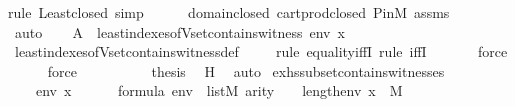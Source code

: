\begin{isabellebody}
{\isacharparenleft}{\kern0pt}rule\ Least{\isacharunderscore}{\kern0pt}closed{\isacharcomma}{\kern0pt}\ simp{\isacharparenright}{\kern0pt}\isanewline
\ \ \ \ \isamarkupfalse%
\ domain{\isacharunderscore}{\kern0pt}closed\ cartprod{\isacharunderscore}{\kern0pt}closed\ P{\isacharunderscore}{\kern0pt}in{\isacharunderscore}{\kern0pt}M\ assms\isanewline
\ \ \ \ \isamarkupfalse%
\ auto\isanewline
\isanewline
\ \ \isamarkupfalse%
\ {\isachardoublequoteopen}{\isacharquery}{\kern0pt}A\ {\isacharequal}{\kern0pt}\ least{\isacharunderscore}{\kern0pt}indexes{\isacharunderscore}{\kern0pt}of{\isacharunderscore}{\kern0pt}Vset{\isacharunderscore}{\kern0pt}contains{\isacharunderscore}{\kern0pt}witness{\isacharparenleft}{\kern0pt}{\isasymphi}{\isacharcomma}{\kern0pt}\ env{\isacharcomma}{\kern0pt}\ x{\isacharparenright}{\kern0pt}{\isachardoublequoteclose}\ \isanewline
\ \ \ \ \isamarkupfalse%
\ least{\isacharunderscore}{\kern0pt}indexes{\isacharunderscore}{\kern0pt}of{\isacharunderscore}{\kern0pt}Vset{\isacharunderscore}{\kern0pt}contains{\isacharunderscore}{\kern0pt}witness{\isacharunderscore}{\kern0pt}def\isanewline
\ \ \ \ \isamarkupfalse%
{\isacharparenleft}{\kern0pt}rule\ equality{\isacharunderscore}{\kern0pt}iffI{\isacharcomma}{\kern0pt}\ rule\ iffI{\isacharparenright}{\kern0pt}\isanewline
\ \ \ \ \ \isamarkupfalse%
\ force\isanewline
\ \ \ \ \isamarkupfalse%
\ force\isanewline
\ \ \ \ \isamarkupfalse%
\isanewline
\isanewline
\ \ \isamarkupfalse%
\ \isamarkupfalse%
\ {\isacharquery}{\kern0pt}thesis\ \isamarkupfalse%
\ H\ \isamarkupfalse%
\ auto\isanewline
{}\isamarkupfalse%
%
\endisatagproof
{\isafoldproof}%
%
\isadelimproof
\isanewline
%
\endisadelimproof
\isanewline
{}\isamarkupfalse%
\ ex{\isacharunderscore}{\kern0pt}hs{\isacharunderscore}{\kern0pt}subset{\isacharunderscore}{\kern0pt}contains{\isacharunderscore}{\kern0pt}witnesses\ {\isacharcolon}{\kern0pt}\ \isanewline
\ \ \ {\isasymphi}\ env\ x\ \isanewline
\ \ \ {\isachardoublequoteopen}{\isasymphi}\ {\isasymin}\ formula{\isachardoublequoteclose}\ {\isachardoublequoteopen}env\ {\isasymin}\ list{\isacharparenleft}{\kern0pt}M{\isacharparenright}{\kern0pt}{\isachardoublequoteclose}\ {\isachardoublequoteopen}arity{\isacharparenleft}{\kern0pt}{\isasymphi}{\isacharparenright}{\kern0pt}\ {\isasymle}\ {}\ {\isacharhash}{\kern0pt}{\isacharplus}{\kern0pt}\ length{\isacharparenleft}{\kern0pt}env{\isacharparenright}{\kern0pt}{\isachardoublequoteclose}\ {\isachardoublequoteopen}x\ {\isasymin}\ M{\isachardoublequoteclose}\ \isanewline

\end{isabellebody}
